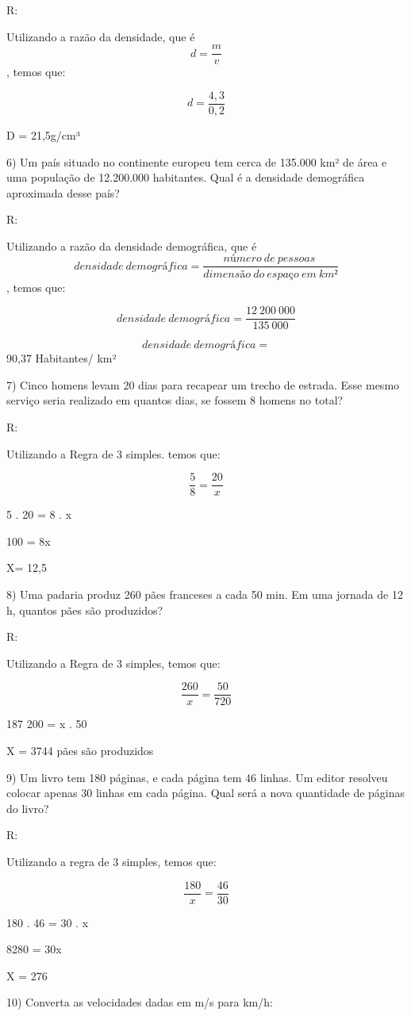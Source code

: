 R:

Utilizando a razão da densidade, que é \[d = \frac{m}{v}\], temos que:

\[d = \frac{4,3}{0,2}\]

D = 21,5g/cm³

6) Um país situado no continente europeu tem cerca de 135.000 km² de
área e uma população de 12.200.000 habitantes. Qual é a densidade
demográfica aproximada desse país?

R:

Utilizando a razão da densidade demográfica, que é
\[densidade\ demográfica = \frac{número\ de\ pessoas\ }{dimensão\ do\ espaço\ em\ km²}\],
temos que:

\[densidade\ demográfica = \frac{12\ 200\ 000}{135\ 000}\]

\[densidade\ demográfica =\] 90,37 Habitantes/ km²

7) Cinco homens levam 20 dias para recapear um trecho de estrada. Esse
mesmo serviço seria realizado em quantos dias, se fossem 8 homens no
total?

R:

Utilizando a Regra de 3 simples. temos que:

\[\frac {5}{8} = \frac{20}{x}\]

5 . 20 = 8 . x

100 = 8x

X= 12,5

8) Uma padaria produz 260 pães franceses a cada 50 min. Em uma jornada
de 12 h, quantos pães são produzidos?

R:

Utilizando a Regra de 3 simples, temos que:

\[\frac {260}{x} = \frac{50}{720}\]

187 200 = x . 50

X = 3744 pães são produzidos

9) Um livro tem 180 páginas, e cada página tem 46 linhas. Um editor
resolveu colocar apenas 30 linhas em cada página. Qual será a nova
quantidade de páginas do livro?

R:

Utilizando a regra de 3 simples, temos que:

\[\frac {180}{x} = \frac{46}{30}\]

180 . 46 = 30 . x

8280 = 30x

X = 276

10) Converta as velocidades dadas em m/s para km/h:

